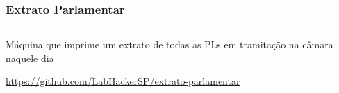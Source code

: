 \documentclass{beamer}
\begin{document}
\begin{frame}
  \frametitle{Extrato Parlamentar}
  \begin{columns}
    \begin{column}{0.5\textwidth}
      Máquina que imprime um extrato de todas as PLs em tramitação na câmara naquele dia
      
      \vspace{\baselineskip}%
      \url{https://github.com/LabHackerSP/extrato-parlamentar}
    \end{column}
    \begin{column}{0.5\textwidth}
    \end{column}
  \end{columns}
\end{frame}
\end{document}
